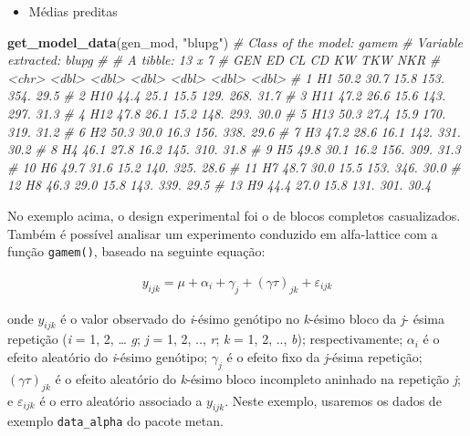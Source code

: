 \documentclass[
]{book}
\newenvironment{Shaded}{\begin{snugshade}}{\end{snugshade}}
\newcommand{\CommentTok}[1]{\textcolor[rgb]{0.56,0.35,0.01}{\textit{#1}}}
\newcommand{\KeywordTok}[1]{\textcolor[rgb]{0.13,0.29,0.53}{\textbf{#1}}}
\newcommand{\NormalTok}[1]{#1}
\newcommand{\StringTok}[1]{\textcolor[rgb]{0.31,0.60,0.02}{#1}}
\providecommand{\tightlist}{%
  \setlength{\itemsep}{0pt}\setlength{\parskip}{0pt}}
\begin{document}
\begin{itemize}
\tightlist
\item
  Médias preditas
\end{itemize}

\begin{Shaded}
\begin{Highlighting}[]
\KeywordTok{get_model_data}\NormalTok{(gen_mod, }\StringTok{"blupg"}\NormalTok{)}
\CommentTok{# Class of the model: gamem}
\CommentTok{# Variable extracted: blupg}
\CommentTok{# # A tibble: 13 x 7}
\CommentTok{#    GEN      ED    CL    CD    KW   TKW   NKR}
\CommentTok{#    <chr> <dbl> <dbl> <dbl> <dbl> <dbl> <dbl>}
\CommentTok{#  1 H1     50.2  30.7  15.8  153.  354.  29.5}
\CommentTok{#  2 H10    44.4  25.1  15.5  129.  268.  31.7}
\CommentTok{#  3 H11    47.2  26.6  15.6  143.  297.  31.3}
\CommentTok{#  4 H12    47.8  26.1  15.2  148.  293.  30.0}
\CommentTok{#  5 H13    50.3  27.4  15.9  170.  319.  31.2}
\CommentTok{#  6 H2     50.3  30.0  16.3  156.  338.  29.6}
\CommentTok{#  7 H3     47.2  28.6  16.1  142.  331.  30.2}
\CommentTok{#  8 H4     46.1  27.8  16.2  145.  310.  31.8}
\CommentTok{#  9 H5     49.8  30.1  16.2  156.  309.  31.3}
\CommentTok{# 10 H6     49.7  31.6  15.2  140.  325.  28.6}
\CommentTok{# 11 H7     48.7  30.0  15.5  153.  346.  30.0}
\CommentTok{# 12 H8     46.3  29.0  15.8  143.  339.  29.5}
\CommentTok{# 13 H9     44.4  27.0  15.8  131.  301.  30.4}
\end{Highlighting}
\end{Shaded}

No exemplo acima, o design experimental foi o de blocos completos casualizados. Também é possível analisar um experimento conduzido em alfa-lattice com a função \texttt{gamem()}, baseado na seguinte equação:

\begin{gather}
y_{ijk}= \mu  + \alpha_i + \gamma_j + (\gamma \tau)_{jk} + \varepsilon_{ijk}
\end{gather}

onde \(y_ {ijk}\) é o valor observado do \emph{i}-ésimo genótipo no \emph{k}-ésimo bloco da \emph{j}- ésima repetição (\emph{i} = 1, 2, \ldots{} \emph{g}; \emph{j} = 1, 2, .., \emph{r}; \emph{k} = 1, 2, .., \emph{b}); respectivamente; \(\alpha_i\) é o efeito aleatório do \emph{i}-ésimo genótipo; \(\gamma_j\) é o efeito fixo da \emph{j}-ésima repetição; \((\gamma \tau)_{jk}\) é o efeito aleatório do \emph{k}-ésimo bloco incompleto aninhado na repetição \emph{j}; e \(\varepsilon_{ijk}\) é o erro aleatório associado a \(y_{ijk}\). Neste exemplo, usaremos os dados de exemplo \texttt{data\_alpha} do pacote metan.
\end{document}
